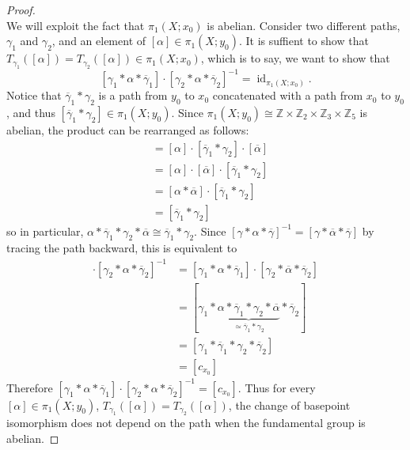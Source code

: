 \documentclass{article}
\begin{document}
\begin{proof} \text{} \\
  We will exploit the fact that $\pi_1(X; x_0)$ is abelian.
  Consider two different paths, $\gamma_1$ and $\gamma_2$, and an element of
  $[\alpha] \in \pi_1(X; y_0)$. It is suffient to show that
  $T_{\gamma_1}([\alpha]) = T_{\gamma_2}([\alpha]) \in \pi_1(X; x_0)$, which is
  to say, we want to show that \[
    [\gamma_1 * \alpha * \overline\gamma_1] \cdot [\gamma_2 * \alpha * \overline\gamma_2]^{-1}
    = \operatorname{id}_{\pi_1(X; x_0)}.
  \]
  Notice that $\overline\gamma_1 * \gamma_2$ is a path from $y_0$ to $x_0$
  concatenated with a path from $x_0$ to $y_0$, and thus
  $[\overline\gamma_1 * \gamma_2] \in \pi_1(X; y_0)$.
  Since $\pi_1(X; y_0) \cong \mathbb Z \times \mathbb Z_2 \times \mathbb Z_3 \times \mathbb Z_5$ is abelian, the product can be rearranged as follows:
  \begin{align*}
    [\alpha * \overline\gamma_1 * \gamma_2 * \overline\alpha]
    &= [\alpha] \cdot [\overline\gamma_1 * \gamma_2] \cdot [\overline\alpha] \\
    &= [\alpha] \cdot [\overline\alpha] \cdot [\overline\gamma_1 * \gamma_2] \\
    &= [\alpha * \overline\alpha] \cdot [\overline\gamma_1 * \gamma_2] \\
    &= [\overline\gamma_1 * \gamma_2]
  \end{align*} so in particular,
  $\alpha * \overline\gamma_1 * \gamma_2 * \overline\alpha \cong \overline\gamma_1 * \gamma_2$.
  Since $[\gamma * \alpha * \overline\gamma]^{-1} = [\gamma * \overline\alpha * \overline\gamma]$
  by tracing the path backward, this is equivalent to \begin{align*}
    [\gamma_1 * \alpha * \overline\gamma_1] \cdot [\gamma_2 * \alpha * \overline\gamma_2]^{-1}
    &= [\gamma_1 * \alpha * \overline\gamma_1] \cdot [\gamma_2 * \overline\alpha * \overline\gamma_2]\\
    &= [\gamma_1 * \underbrace{\alpha * \overline\gamma_1 * \gamma_2 * \overline\alpha}_{\simeq \overline\gamma_1 * \gamma_2} * \overline\gamma_2] \\
    &= [\gamma_1 * \overline\gamma_1 * \gamma_2 * \overline\gamma_2] \\
    &= [c_{x_0}]
  \end{align*}
  Therefore $[\gamma_1 * \alpha * \overline\gamma_1] \cdot [\gamma_2 * \alpha * \overline\gamma_2]^{-1} = [c_{x_0}]$.
  Thus for every $[\alpha] \in \pi_1(X;y_0)$, $T_{\gamma_1}([\alpha]) = T_{\gamma_2}([\alpha])$,
  the change of basepoint isomorphism does not depend on the path when the fundamental group is abelian.
\end{proof}
\end{document}
